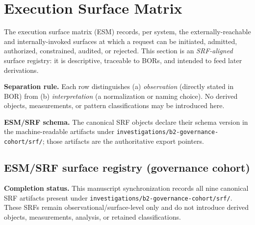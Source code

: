 \section{Execution Surface Matrix}
\label{sec:esm}
The execution surface matrix (ESM) records, per system, the externally-reachable and internally-invoked surfaces at which a request can be initiated, admitted, authorized, constrained, audited, or rejected. This section is an \emph{SRF-aligned} surface registry: it is descriptive, traceable to BORs, and intended to feed later derivations.

\textbf{Separation rule.} Each row distinguishes (a) \emph{observation} (directly stated in BOR) from (b) \emph{interpretation} (a normalization or naming choice). No derived objects, measurements, or pattern classifications may be introduced here.

\textbf{ESM/SRF schema.} The canonical SRF objects declare their schema version in the machine-readable artifacts under \texttt{investigations/b2-governance-cohort/srf/}; those artifacts are the authoritative export pointers.

\subsection{ESM/SRF surface registry (governance cohort)}
\textbf{Completion status.} This manuscript synchronization records all nine canonical SRF artifacts present under \texttt{investigations/b2-governance-cohort/srf/}. These SRFs remain observational/surface-level only and do not introduce derived objects, measurements, analysis, or retained classifications.

